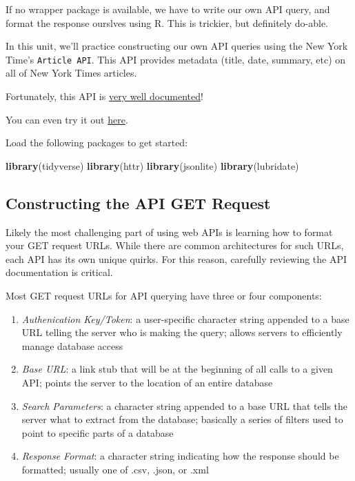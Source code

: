 \documentclass[]{book}
\newenvironment{Shaded}{\begin{snugshade}}{\end{snugshade}}
\newcommand{\KeywordTok}[1]{\textcolor[rgb]{0.13,0.29,0.53}{\textbf{#1}}}
\newcommand{\NormalTok}[1]{#1}
\begin{document}
If no wrapper package is available, we have to write our own API query, and format the response ourslves using R. This is trickier, but definitely do-able.

In this unit, we'll practice constructing our own API queries using the New York Time's \texttt{Article\ API}. This API provides metadata (title, date, summary, etc) on all of New York Times articles.

Fortunately, this API is \href{https://developer.nytimes.com/docs/articlesearch-product/1/overview}{very well documented}!

You can even try it out \href{http://developer.nytimes.com/io-docs}{here}.

Load the following packages to get started:

\begin{Shaded}
\begin{Highlighting}[]
\KeywordTok{library}\NormalTok{(tidyverse)}
\KeywordTok{library}\NormalTok{(httr)}
\KeywordTok{library}\NormalTok{(jsonlite)}
\KeywordTok{library}\NormalTok{(lubridate)}
\end{Highlighting}
\end{Shaded}

\hypertarget{constructing-the-api-get-request}{%
\subsection{Constructing the API GET Request}\label{constructing-the-api-get-request}}

Likely the most challenging part of using web APIs is learning how to format your GET request URLs. While there are common architectures for such URLs, each API has its own unique quirks. For this reason, carefully reviewing the API documentation is critical.

Most GET request URLs for API querying have three or four components:

\begin{enumerate}
\def\labelenumi{\arabic{enumi}.}
\item
  \emph{Authenication Key/Token}: a user-specific character string appended to a base URL telling the server who is making the query; allows servers to efficiently manage database access
\item
  \emph{Base URL}: a link stub that will be at the beginning of all calls to a given API; points the server to the location of an entire database
\item
  \emph{Search Parameters}: a character string appended to a base URL that tells the server what to extract from the database; basically a series of filters used to point to specific parts of a database
\item
  \emph{Response Format}: a character string indicating how the response should be formatted; usually one of .csv, .json, or .xml
\end{enumerate}
\end{document}
